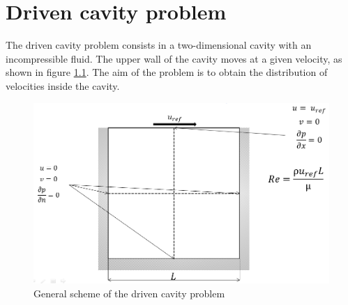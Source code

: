 \chapter{Driven cavity problem}
The driven cavity problem consists in a two-dimensional cavity with an incompressible fluid. The upper wall of the cavity moves at a given velocity, as shown in figure \ref{DrivenCavityImg}. The aim of the problem is to obtain the distribution of velocities inside the cavity.
\begin{figure}
	\centering
	\includegraphics[scale=0.5]{DrivenCavity/DrivenCavity}
	\caption{General scheme of the driven cavity problem}
	\label{DrivenCavityImg}
\end{figure}

